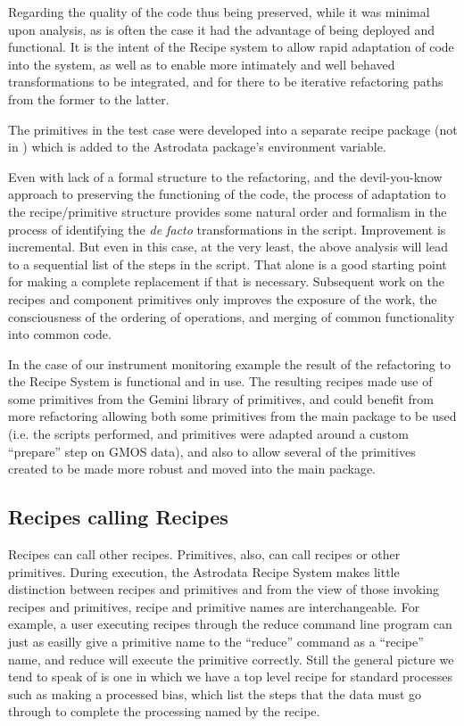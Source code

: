 \documentclass[letterpaper,10pt,english]{sphinxmanual}
\begin{document}
Regarding the quality of the code thus being preserved, while it was
minimal upon analysis, as is often the case it had the advantage of
being deployed and functional. It is the intent of the Recipe system
to allow rapid adaptation of code into the system, as well as to
enable more intimately and well behaved transformations to be
integrated, and for there to be iterative refactoring paths from the
former to the latter.

The primitives in the test case were developed into a separate recipe
package (not in ) which is added to the
Astrodata package's  environment variable.

Even with lack of a formal structure to the refactoring, and the
devil-you-know approach to preserving the functioning of the code, the
process of adaptation to the recipe/primitive structure provides some
natural order and formalism in the process of identifying the \emph{de facto}
transformations in the script. Improvement is incremental. But even in this
case, at the very least, the
above analysis will lead to a sequential list of the steps in the
script. That alone is a good starting point for making a complete
replacement if that is necessary. Subsequent work on the recipes and
component primitives only improves the exposure of the work, the
consciousness of the ordering of operations, and merging of common
functionality into common code.

In the case of our instrument monitoring example the result of the
refactoring to the Recipe System is functional and in use. The
resulting recipes made use of some primitives from the Gemini library
of primitives, and could benefit from more refactoring allowing both
some primitives from the main package to be used (i.e. the scripts
performed, and primitives were adapted around a custom ``prepare'' step
on GMOS data), and also to allow several of the primitives created to
be made more robust and moved into the main package.


\subsection{Recipes calling Recipes}
\label{gen.ADMANUAL_ADConcepts:recipes-calling-recipes}
Recipes can call other recipes.
Primitives, also, can call recipes or other primitives. During
execution, the Astrodata Recipe System makes little distinction
between recipes and primitives and from the view of those invoking
recipes and primitives, recipe and primitive names are
interchangeable. For example, a user executing recipes through the reduce
command line program can just as easilly give a primitive name to the
``reduce'' command as a ``recipe'' name, and reduce will execute the
primitive correctly. Still the general picture we tend to speak of is
one in which we have a top level recipe for standard processes such as
making a processed bias, which list the steps that the data must go
through to complete the processing named by the recipe.
\end{document}
